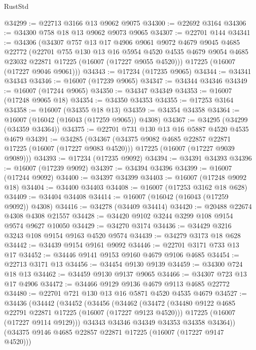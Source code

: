 \begin{lexlean}{RustStd}
\begin{coremodule}
@34299 := @22713 @3166 @13 @9062 @9075
@34300 := @22692 @3164
@34306 := @34300 @758 @18 @13 @9062 @9073 @9065
@34307 := @22701 @144
@34341 := @34306
    (@34307
      @757
      @13
      @17
      @4906
      @9061
      @9072
      @4679
      @9045
      @4685
      @22772
      (@22701
        @755
        @130
        @13
        @16
        @5954
        @4520
        @4535
        @4679
        @9054
        @4685
        @23032
        @22871
        @17225
        (@16007 (@17227 @9055 @4520)))
      @17225
      (@16007 (@17227 @9046 @9061)))
@34343 := @17234 (@17235 @9065)
@34344 := @34341 @34343
@34346 := @16007 (@17239 @9065)
@34347 := @34344 @34346
@34349 := @16007 (@17244 @9065)
@34350 := @34347 @34349
@34353 := @16007 (@17248 @9065 @18)
@34354 := @34350 @34353
@34355 := @17253 @3164
@34358 := @16007 (@34355 @18 @13)
@34359 := @34354 @34358
@34364 := @16007 (@16042 (@16043 (@17259 @9065)) @4308)
@34367 := @34295 (@34299 (@34359 @34364))
@34375 := @22701 @731 @130 @13 @16 @5887 @4520 @4535 @4679
@34391 := @34285
    (@34367
      (@34375 @9082 @4685 @22857 @22871 @17225 (@16007 (@17227 @9083 @4520)))
      @17225
      (@16007 (@17227 @9039 @9089)))
@34393 := @17234 (@17235 @9092)
@34394 := @34391 @34393
@34396 := @16007 (@17239 @9092)
@34397 := @34394 @34396
@34399 := @16007 (@17244 @9092)
@34400 := @34397 @34399
@34403 := @16007 (@17248 @9092 @18)
@34404 := @34400 @34403
@34408 := @16007 (@17253 @3162 @18 @628)
@34409 := @34404 @34408
@34414 := @16007 (@16042 (@16043 (@17259 @9092)) @4308)
@34416 := @34278 (@34409 @34414)
@34420 := @20488 @22674 @4308 @4308 @21557
@34428 := @34420 @9102 @3244 @3299 @108 @9154 @9574 @9627 @10050
@34429 := @34270 @3174
@34436 := @34429 @3216 @3243 @108 @9154 @9163 @4520 @9574
@34439 := @34279 @3173 @18 @628
@34442 := @34439 @9154 @9161 @9092
@34446 := @22701 @3171 @733 @13 @17
@34452 := @34446 @9141 @9153 @9160 @4679 @9106 @4685
@34454 := @22713 @3171 @13
@34456 := @34454 @9130 @9139
@34459 := @34300 @724 @18 @13
@34462 := @34459 @9130 @9137 @9065
@34466 := @34307 @723 @13 @17 @4906
@34472 := @34466 @9129 @9136 @4679 @9113 @4685 @22772
@34480 := @22701 @721 @130 @13 @16 @5871 @4520 @4535 @4679
@34527 := @34436
    (@34442
      (@34452
        (@34456
          (@34462
            (@34472
              (@34480 @9122 @4685 @22791 @22871 @17225 (@16007 (@17227 @9123 @4520)))
              @17225
              (@16007 (@17227 @9114 @9129)))
            @34343
            @34346
            @34349
            @34353
            @34358
            @34364))
        (@34375 @9146 @4685 @22857 @22871 @17225 (@16007 (@17227 @9147 @4520)))

\end{coremodule}
\end{lexlean}
